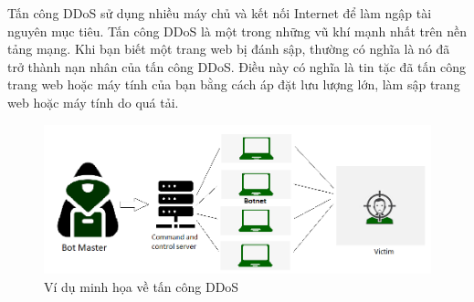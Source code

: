 \documentclass[a4paper]{article}
\begin{document}
Tấn công DDoS sử dụng nhiều máy chủ và kết nối Internet để làm ngập tài nguyên mục tiêu. Tấn công DDoS là một trong những vũ khí mạnh nhất trên nền tảng mạng. Khi bạn biết một trang web bị đánh sập, thường có nghĩa là nó đã trở thành nạn nhân của tấn công DDoS. Điều này có nghĩa là tin tặc đã tấn công trang web hoặc máy tính của bạn bằng cách áp đặt lưu lượng lớn, làm sập trang web hoặc máy tính do quá tải.
\begin{figure}
    \centering
    \includegraphics[width=0.8\linewidth]{images/ddos.png}
    \caption{Ví dụ minh họa về tấn công DDoS}
    \label{fig:ddos}
\end{figure}
\end{document}
